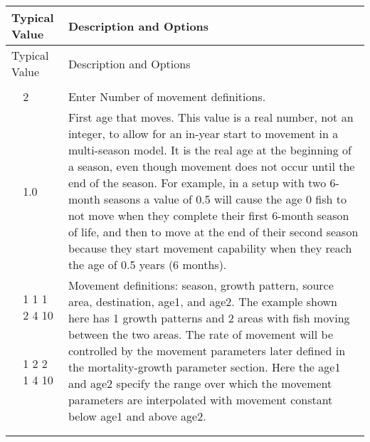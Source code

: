 \begin{longtable}{p{0.5cm} p{2cm} p{12.5cm}}
	\hline
	\multicolumn{2}{l}{Typical Value} & Description and Options \Tstrut\Bstrut\\
	\hline
	\endfirsthead

	\hline
	\multicolumn{2}{l}{Typical Value} & Description and Options \Tstrut\Bstrut\\
	\hline
	\endhead

	\hline
	\endfoot

	\endlastfoot
	
	\multicolumn{3}{l}{COND: only if areas > 1} \Tstrut\\ 
	& 2 & Enter Number of movement definitions. \Tstrut\\		
	\Tstrut & 1.0 & First age that moves. This value is a real number, not an integer, to allow for an in-year start to movement in a multi-season model. It is the real age at the beginning of a season, even though movement does not occur until the end of the season. For example, in a setup with two 6-month seasons a value of 0.5 will cause the age 0 fish to not move when they complete their first 6-month season of life, and then to move at the end of their second season because they start movement capability when they reach the age of 0.5 years (6 months). \\

	\Tstrut & 1 1 1 2 4 10 & \multicolumn{1}{l}{\multirow{5}{6cm}{\parbox{12cm}{Movement definitions: season, growth pattern, source area, destination, age1, and age2. The example shown here has 1 growth patterns and 2 areas with fish moving between the two areas. The rate of movement will be controlled by the movement parameters later defined in the mortality-growth parameter section. Here the age1 and age2 specify the range over which the movement parameters are interpolated with movement constant below age1 and above age2.}}} \\
	& 1 2 2 1 4 10 & \Bstrut\\
	\\
	\\
	\\
	\\ 
	\\
	\hline
\end{longtable}
\vspace*{-\baselineskip}
	

